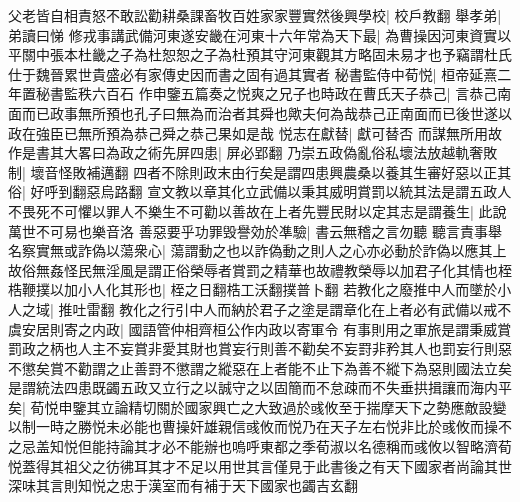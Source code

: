 父老皆自相責怒不敢訟勸耕桑課畜牧百姓家家豐實然後興學校|{
	校戶教翻}
舉孝弟|{
	弟讀曰悌}
修戎事講武備河東遂安畿在河東十六年常為天下最|{
	為曹操因河東資實以平關中張本杜畿之子為杜恕恕之子為杜預其守河東觀其方略固未易才也予竊謂杜氏仕于魏晉累世貴盛必有家傳史因而書之固有過其實者}
秘書監侍中荀悦|{
	桓帝延熹二年置秘書監秩六百石}
作申鑒五篇奏之悦爽之兄子也時政在曹氏天子恭己|{
	言恭己南面而已政事無所預也孔子曰無為而治者其舜也歟夫何為哉恭己正南面而已後世遂以政在強臣已無所預為恭己舜之恭己果如是哉}
悦志在獻替|{
	獻可替否}
而謀無所用故作是書其大畧曰為政之術先屏四患|{
	屏必郢翻}
乃崇五政偽亂俗私壞法放越軌奢敗制|{
	壞音怪敗補邁翻}
四者不除則政末由行矣是謂四患興農桑以養其生審好惡以正其俗|{
	好呼到翻惡烏路翻}
宣文教以章其化立武備以秉其威明賞罰以統其法是謂五政人不畏死不可懼以罪人不樂生不可勸以善故在上者先豐民財以定其志是謂養生|{
	此說萬世不可易也樂音洛}
善惡要乎功罪毁譽効於凖驗|{
	書云無稽之言勿聽}
聽言責事舉名察實無或詐偽以蕩衆心|{
	蕩謂動之也以詐偽動之則人之心亦必動於詐偽以應其上}
故俗無姦怪民無淫風是謂正俗榮辱者賞罰之精華也故禮教榮辱以加君子化其情也桎梏鞭撲以加小人化其形也|{
	桎之日翻梏工沃翻撲普卜翻}
若教化之廢推中人而墜於小人之域|{
	推吐雷翻}
教化之行引中人而納於君子之塗是謂章化在上者必有武備以戒不虞安居則寄之内政|{
	國語管仲相齊桓公作内政以寄軍令}
有事則用之軍旅是謂秉威賞罰政之柄也人主不妄賞非愛其財也賞妄行則善不勸矣不妄罸非矜其人也罰妄行則惡不懲矣賞不勸謂之止善罸不懲謂之縱惡在上者能不止下為善不縱下為惡則國法立矣是謂統法四患既蠲五政又立行之以誠守之以固簡而不怠疎而不失垂拱揖讓而海内平矣|{
	荀悦申鑒其立論精切關於國家興亡之大致過於彧攸至于揣摩天下之勢應敵設變以制一時之勝悦未必能也曹操奸雄親信彧攸而悦乃在天子左右悦非比於彧攸而操不之忌盖知悦但能持論其才必不能辦也嗚呼東都之季荀淑以名德稱而彧攸以智略濟荀悦蓋得其祖父之彷彿耳其才不足以用世其言僅見于此書後之有天下國家者尚論其世深味其言則知悦之忠于漢室而有補于天下國家也蠲吉玄翻}


